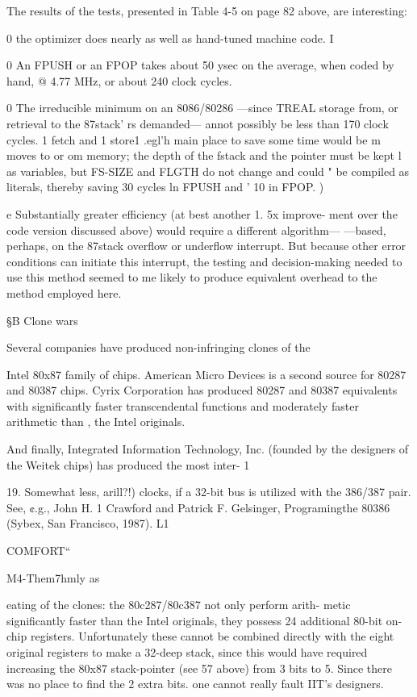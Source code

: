 The results of the tests, presented in Table 4-5 on page 82 above,
are interesting:

0 the optimizer does nearly as well as hand-tuned machine code. I

0 An FPUSH or an FPOP takes about 50 ysec on the average,
when coded by hand, @ 4.77 MHz, or about 240 clock cycles.

0 The irreducible minimum on an 8086/80286 —since TREAL
storage from, or retrieval to the 87stack' rs demanded— annot
possibly be less than 170 clock cycles. 1 fetch and 1 store1 .egl'h
main place to save some time would be m moves to or om
memory; the depth of the fstack and the pointer must be kept l
as variables, but FS-SIZE and FLGTH do not change and could "
be compiled as literals, thereby saving 30 cycles ln FPUSH and '
10 in FPOP. )

e Substantially greater efficiency (at best another 1. 5x improve-
ment over the code version discussed above) would require a
different algorithm— —based, perhaps, on the 87stack overﬂow
or underﬂow interrupt. But because other error conditions can
initiate this interrupt, the testing and decision-making needed
to use this method seemed to me likely to produce equivalent
overhead to the method employed here.

 

§B Clone wars

Several companies have produced non-infringing clones of the

Intel 80x87 family of chips. American Micro Devices is a second
source for 80287 and 80387 chips. Cyrix Corporation has
produced 80287 and 80387 equivalents with signiﬁcantly faster
transcendental functions and moderately faster arithmetic than ,
the Intel originals.

And ﬁnally, Integrated Information Technology, Inc. (founded by
the designers of the Weitek chips) has produced the most inter- 1

 

19. Somewhat less, arill?!) clocks, if a 32-bit bus is utilized with the 386/387 pair. See, ¢.g., John H. 1
Crawford and Patrick F. Gelsinger, Programingthe 80386 (Sybex, San Francisco, 1987). L1

COMFORT“

M4-Them7hmly as

eating of the clones: the 80c287/80c387 not only perform arith-
metic significantly faster than the Intel originals, they possess 24
additional 80-bit on-chip registers. Unfortunately these cannot
be combined directly with the eight original registers to make a
32-deep stack, since this would have required increasing the
80x87 stack-pointer (see 57 above) from 3 bits to 5. Since there
was no place to ﬁnd the 2 extra bits. one cannot really fault IIT's
designers.

